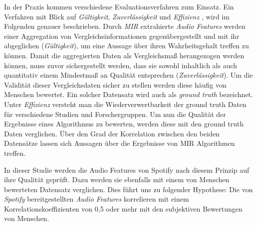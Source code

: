 In der Praxis kommen verschiedene Evaluationsverfahren zum Einsatz.
Ein Verfahren mit Blick auf \textit{Gültigkeit}, \textit{Zuverlässigkeit} und \textit{Effizienz} \cite{Urbano_2013}, wird im Folgenden genauer beschrieben.
Durch \textit{MIR} extrahierte \textit{Audio Features} werden einer Aggregation von Vergleichsinformationen gegenübergestellt und mit ihr abgeglichen (\textit{Gültigkeit}), um eine Aussage über ihren Wahrheitsgehalt treffen zu können.
Damit die aggregierten Daten als Vergleichsmaß herangezogen werden können, muss zuvor sichergestellt werden, dass sie sowohl inhaltlich als auch quantitativ einem Mindestmaß an Qualität entsprechen (\textit{Zuverlässigkeit}).
Um die Validität dieser Vergleichsdaten sicher zu stellen werden diese häufig von Menschen bewertet.
Ein solcher Datensatz wird auch als \textit{ground truth} bezeichnet.
Unter \textit{Effizienz} versteht man die Wiederverwertbarkeit der ground truth Daten für verschiedene Studien und Forschergruppen.
Um nun die Qualität der Ergebnisse eines Algorithmus zu bewerten, werden diese mit den ground truth Daten verglichen.
Über den Grad der Korrelation zwischen den beiden Datensätze lassen sich Aussagen über die Ergebnisse von MIR Algorithmen treffen.

In dieser Studie werden die Audio Features von Spotify nach diesem Prinzip auf ihre Qualität geprüft.
Dazu werden sie ebenfalls mit einem von Menschen bewerteten Datensatz verglichen.
Dies führt uns zu folgender Hypothese:
Die von \textit{Spotify} bereitgestellten \textit{Audio Features} korrelieren mit einem Korrelationskoeffizienten von 0,5 oder mehr mit den subjektiven Bewertungen von Menschen.
